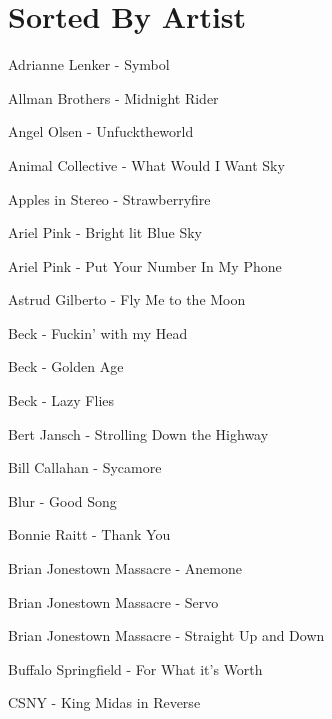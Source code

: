 \section*{Sorted By Artist}
Adrianne Lenker - Symbol \dotfill \pageref{Symbol - Adrianne Lenker} 

Allman Brothers - Midnight Rider \dotfill \pageref{Midnight Rider - Allman Brothers} 

Angel Olsen - Unfucktheworld \dotfill \pageref{Unfucktheworld - Angel Olsen} 

Animal Collective - What Would I Want Sky \dotfill \pageref{What Would I Want Sky - Animal Collective} 

Apples in Stereo - Strawberryfire \dotfill \pageref{Strawberryfire - Apples in Stereo} 

Ariel Pink - Bright lit Blue Sky \dotfill \pageref{Bright lit Blue Sky - Ariel Pink} 

Ariel Pink - Put Your Number In My Phone \dotfill \pageref{Put Your Number In My Phone - Ariel Pink} 

Astrud Gilberto - Fly Me to the Moon \dotfill \pageref{Fly Me to the Moon - Astrud Gilberto} 

Beck - Fuckin' with my Head \dotfill \pageref{Fuckin' with my Head - Beck} 

Beck - Golden Age \dotfill \pageref{Golden Age - Beck} 

Beck - Lazy Flies \dotfill \pageref{Lazy Flies - Beck} 

Bert Jansch - Strolling Down the Highway \dotfill \pageref{Strolling Down the Highway - Bert Jansch} 

Bill Callahan - Sycamore \dotfill \pageref{Sycamore - Bill Callahan} 

Blur - Good Song \dotfill \pageref{Good Song - Blur} 

Bonnie Raitt - Thank You \dotfill \pageref{Thank You - Bonnie Raitt} 

Brian Jonestown Massacre - Anemone \dotfill \pageref{Anemone - Brian Jonestown Massacre} 

Brian Jonestown Massacre - Servo \dotfill \pageref{Servo - Brian Jonestown Massacre} 

Brian Jonestown Massacre - Straight Up and Down \dotfill \pageref{Straight Up and Down - Brian Jonestown Massacre} 

Buffalo Springfield - For What it's Worth \dotfill \pageref{For What it's Worth - Buffalo Springfield} 

CSNY - King Midas in Reverse \dotfill \pageref{King Midas in Reverse - CSNY} 

